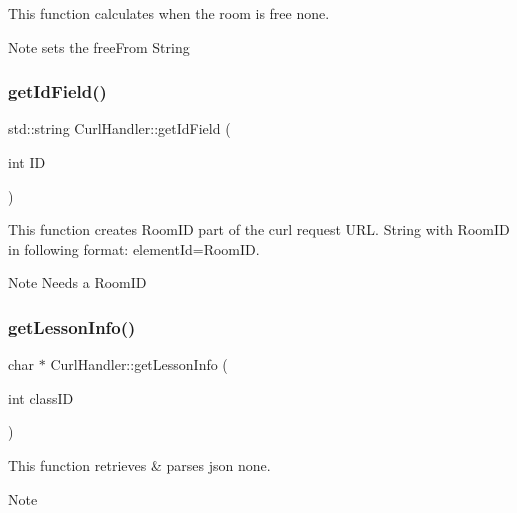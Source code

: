 This function calculates when the room is free  none. 

\begin{DoxyNote}{Note}
sets the free\+From String 
\end{DoxyNote}
\mbox{\label{classCurlHandler_a26d8a6f384d54fd7af70fde33232531a}} 
\subsubsection{\texorpdfstring{get\+Id\+Field()}{getIdField()}}
{\footnotesize\ttfamily std\+::string Curl\+Handler\+::get\+Id\+Field (\begin{DoxyParamCaption}\item[{int}]{ID }\end{DoxyParamCaption})}



This function creates Room\+ID part of the curl request U\+RL.  String with Room\+ID in following format\+: element\+Id=Room\+ID. 

\begin{DoxyNote}{Note}
Needs a Room\+ID 
\end{DoxyNote}
\mbox{\label{classCurlHandler_a8f82086fdc6993eb9068a25632652fb0}} 
\subsubsection{\texorpdfstring{get\+Lesson\+Info()}{getLessonInfo()}}
{\footnotesize\ttfamily char $\ast$ Curl\+Handler\+::get\+Lesson\+Info (\begin{DoxyParamCaption}\item[{int}]{class\+ID }\end{DoxyParamCaption})}



This function retrieves \& parses json  none. 

\begin{DoxyNote}{Note}

\end{DoxyNote}
\mbox{\label{classCurlHandler_acd45a047ecf8bad0977f8e890914a59a}} 
